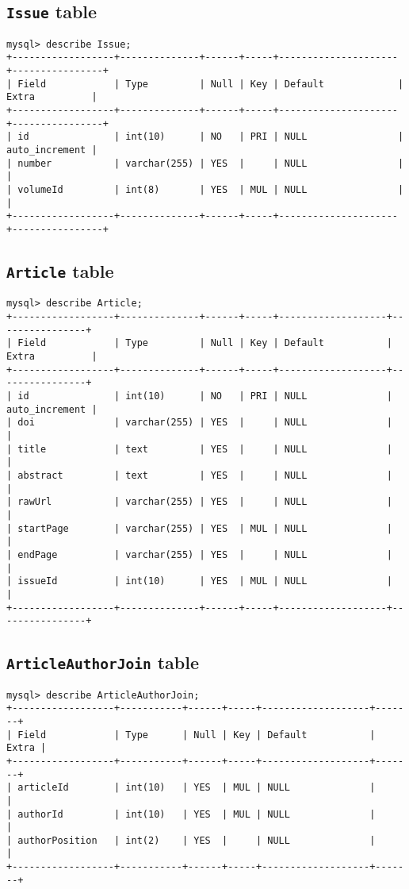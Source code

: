 {\subsection{{\tt Issue} table}
\begin{verbatim}
mysql> describe Issue;
+------------------+--------------+------+-----+---------------------+----------------+
| Field            | Type         | Null | Key | Default             | Extra          |
+------------------+--------------+------+-----+---------------------+----------------+
| id               | int(10)      | NO   | PRI | NULL                | auto_increment | 
| number           | varchar(255) | YES  |     | NULL                |                | 
| volumeId         | int(8)       | YES  | MUL | NULL                |                | 
+------------------+--------------+------+-----+---------------------+----------------+
\end{verbatim}

\subsection{{\tt Article} table}
\begin{verbatim}
mysql> describe Article;
+------------------+--------------+------+-----+-------------------+----------------+
| Field            | Type         | Null | Key | Default           | Extra          |
+------------------+--------------+------+-----+-------------------+----------------+
| id               | int(10)      | NO   | PRI | NULL              | auto_increment | 
| doi              | varchar(255) | YES  |     | NULL              |                | 
| title            | text         | YES  |     | NULL              |                | 
| abstract         | text         | YES  |     | NULL              |                | 
| rawUrl           | varchar(255) | YES  |     | NULL              |                | 
| startPage        | varchar(255) | YES  | MUL | NULL              |                | 
| endPage          | varchar(255) | YES  |     | NULL              |                | 
| issueId          | int(10)      | YES  | MUL | NULL              |                | 
+------------------+--------------+------+-----+-------------------+----------------+
\end{verbatim}

\subsection{{\tt ArticleAuthorJoin} table}
\begin{verbatim}
mysql> describe ArticleAuthorJoin;
+------------------+-----------+------+-----+-------------------+-------+
| Field            | Type      | Null | Key | Default           | Extra |
+------------------+-----------+------+-----+-------------------+-------+
| articleId        | int(10)   | YES  | MUL | NULL              |       | 
| authorId         | int(10)   | YES  | MUL | NULL              |       | 
| authorPosition   | int(2)    | YES  |     | NULL              |       | 
+------------------+-----------+------+-----+-------------------+-------+
\end{verbatim}

}
